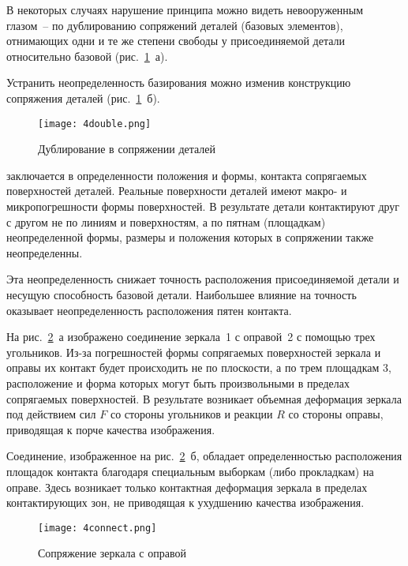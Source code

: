 В некоторых случаях нарушение принципа можно видеть невооруженным глазом~-- по дублированию сопряжений деталей (базовых элементов), отнимающих одни и те же степени свободы у присоединяемой детали относительно базовой (рис.~\ref{pic:4double}~а).

Устранить неопределенность базирования можно изменив конструкцию сопряжения деталей (рис.~\ref{pic:4double}~б). 

\begin{figure}[h!]
	\begin{center}
		\caption{Дублирование в сопряжении деталей}
		\texttt{[image: 4double.png]}
		\label{pic:4double}
	\end{center}
\end{figure}

 заключается в определенности положения и формы, контакта сопрягаемых поверхностей деталей. 
Реальные поверхности деталей имеют макро- и микропогрешности формы поверхностей. 
В результате детали контактируют друг с другом не по линиям и поверхностям, а по пятнам (площадкам) неопределенной формы, размеры и положения которых в сопряжении также неопределенны.

Эта неопределенность снижает точность расположения присоединяемой детали и несущую способность базовой детали. 
Наибольшее влияние на точность оказывает неопределенность расположения пятен контакта.

На рис.~\ref{pic:4connect}~а изображено соединение зеркала~1 с оправой~2 с помощью трех угольников. Из-за погрешностей формы сопрягаемых поверхностей зеркала и оправы их контакт будет происходить не по плоскости, а по трем площадкам 3, расположение и форма которых могут быть произвольными в пределах сопрягаемых поверхностей. В результате возникает объемная деформация зеркала под действием сил $ F $ со стороны угольников и реакции $ R $ со стороны оправы, приводящая к порче качества изображения.

Соединение, изображенное на рис.~\ref{pic:4connect}~б, обладает определенностью расположения площадок контакта благодаря специальным выборкам (либо прокладкам) на оправе. Здесь возникает только контактная деформация зеркала в пределах контактирующих зон, не приводящая к ухудшению качества изображения.

\begin{figure}[h!]
	\caption{Сопряжение зеркала с оправой}
	\texttt{[image: 4connect.png]}
	\label{pic:4connect}
\end{figure}

